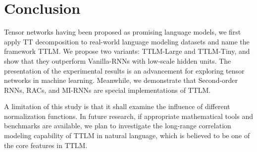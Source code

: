 \section{Conclusion}

Tensor networks having been proposed as promising language models, we first apply TT decomposition to real-world language modeling datasets and name the framework TTLM. We propose two variants: TTLM-Large and TTLM-Tiny, and show that they outperform Vanilla-RNNs with low-scale hidden units. The presentation of the experimental results is an advancement for exploring tensor networks in machine learning. Meanwhile, we demonstrate that Second-order RNNs, RACs, and MI-RNNs are special implementations of TTLM. 

A limitation of this study is that it shall examine the influence of different normalization functions. In future research, if appropriate mathematical tools and benchmarks are available, we plan to investigate the long-range correlation modeling capability of TTLM in natural language, which is believed to be one of the core features in TTLM. 
















